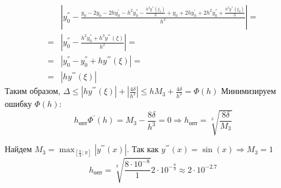 \begin{equation*}
  \begin{split}
    & \left| y_{0}^{''} - \frac{y_{0} - 2y_{0} - 2hy_{0}^{'} - h^{2}y_{0}^{''}-\frac{h^{3}y^{'''}(\xi_{1})}{3} + y_{0} + 2hy_{0}^{'} + 2h^{2}y_{0}^{''} + \frac{h^{3}y^{'''}(\xi_{2})}{3}}{h^{2}} \right| =\\
    = &\left| y_{0}^{''} - \frac{h^{2}y_{0}^{''} + h^{3}y^{'''}(\xi)}{h^{2}} \right| =\\
    = & \left|y_{0}^{''} - y_{0}^{''} + hy^{'''}(\xi) \right| =\\
    = & \left| hy^{'''}(\xi) \right|
  \end{split}
\end{equation*}
Таким образом, $\Delta \leq \left| hy^{'''}(\xi) \right| + \left|\frac{4\delta}{h^{2}}\right| \leq hM_{3} + \frac{4\delta}{h^{2}} = \Phi(h)$
Минимизируем ошибку $\Phi(h)$:
\[
    h_{\text{опт}} \Phi^{'}(h) = M_{3} - \frac{8\delta}{h^{3}} = 0 \Rightarrow h_{\text{опт}} = \sqrt[3]{\frac{8\delta}{M_{3}}}
\]

Найдем $M_{3} = \max_{\left[\frac{\pi}{4}; \pi\right]}|y^{'''}(x)|$. Так как $y^{'''}(x) = \sin(x) \Rightarrow M_{3} = 1$
\[
  h_{\text{опт}} = \sqrt[3]{\frac{8 \cdot 10^{-8}}{1}} 2 \cdot 10^{-\frac{8}{3}} \approx 2 \cdot 10^{-2.7}
\]
